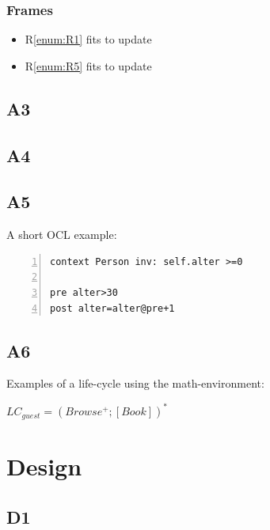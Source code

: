 \documentclass[a4paper,10pt,titlepage,bibtotoc,bibtotocnumbered]{scrreprt}
\begin{document}
\subsection*{Frames}
\begin{itemize}
    \item R\ref{enum:R1} fits to update
    \item R\ref{enum:R5} fits to update
\end{itemize}

\newpage\section{A3}

\newpage\section{A4}

\newpage\section{A5}
A short OCL example:\\
\lstset{language=OCL}          %

\begin{lstlisting}[frame=single,breaklines=true,numbers=left,numberfirstline=true]
context Person inv: self.alter >=0

pre alter>30
post alter=alter@pre+1

\end{lstlisting}

\newpage\section{A6}

Examples of a life-cycle using the math-environment:

$LC_{guest}=(Browse^+;[Book])^*$



\chapter{Design}

\section{D1}
\end{document}
